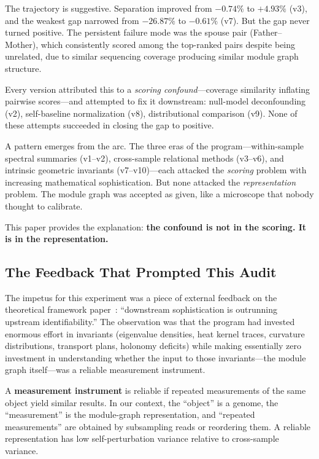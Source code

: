 \documentclass{../yalumba}
\begin{document}
The trajectory is suggestive.  Separation improved from $-0.74\%$ to
$+4.93\%$ (v3), and the weakest gap narrowed from $-26.87\%$ to
$-0.61\%$ (v7).  But the gap never turned positive.  The persistent
failure mode was the spouse pair (Father--Mother), which consistently
scored among the top-ranked pairs despite being unrelated, due to
similar sequencing coverage producing similar module graph structure.

Every version attributed this to a \emph{scoring confound}---coverage
similarity inflating pairwise scores---and attempted to fix it
downstream: null-model deconfounding (v2), self-baseline normalization
(v8), distributional comparison (v9).  None of these attempts succeeded
in closing the gap to positive.

A pattern emerges from the arc.  The three eras of the program---within-sample
spectral summaries (v1--v2), cross-sample relational methods (v3--v6), and
intrinsic geometric invariants (v7--v10)---each attacked the \emph{scoring}
problem with increasing mathematical sophistication.  But none attacked the
\emph{representation} problem.  The module graph was accepted as given, like a
microscope that nobody thought to calibrate.

This paper provides the explanation: \textbf{the confound is not in the
scoring.  It is in the representation.}

\subsection{The Feedback That Prompted This Audit}

The impetus for this experiment was a piece of external feedback on the
theoretical framework paper~\cite{nakahara2003geometry}: ``downstream
sophistication is outrunning upstream identifiability.''  The observation
was that the program had invested enormous effort in invariants
(eigenvalue densities, heat kernel traces, curvature distributions,
transport plans, holonomy deficits) while making essentially zero
investment in understanding whether the input to those invariants---the
module graph itself---was a reliable measurement instrument.

\begin{definition}
A \textbf{measurement instrument} is reliable if repeated measurements
of the same object yield similar results.  In our context, the ``object''
is a genome, the ``measurement'' is the module-graph representation, and
``repeated measurements'' are obtained by subsampling reads or
reordering them.  A reliable representation has low self-perturbation
variance relative to cross-sample variance.
\end{definition}
\end{document}
